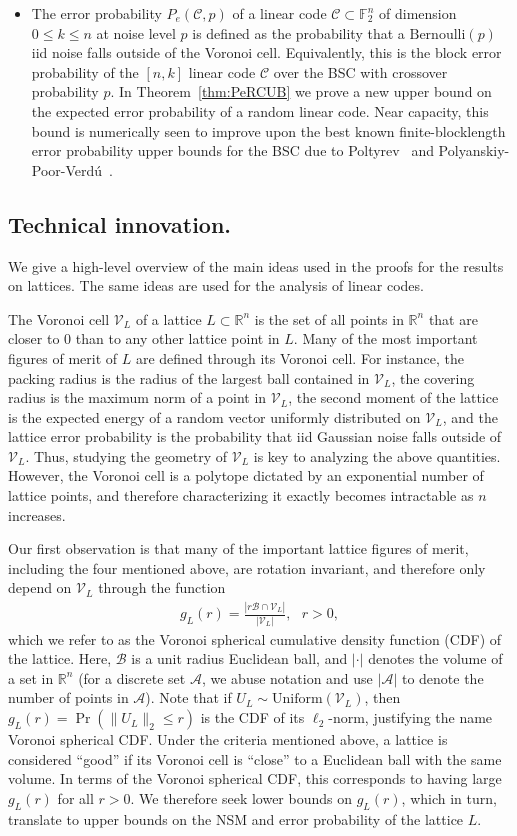 \documentclass[article,doublecolumn]{IEEEtran}
\newcommand{\F}{{\mathbb{F}}}
\newcommand{\R}{{\mathbb{R}}}
\newcommand{\A}{{\mathcal{A}}}
\newcommand{\CC}{{\mathcal{C}}}
\newcommand{\Unif}{\mathrm{Uniform}}
\newcommand{\mVL}{{\mathcal{V}_L}}
\newcommand{\mBeuc}{{\mathcal{B}}}
\newcommand{\VcdfL}{g_L}
\begin{document}
\begin{itemize}
\item The error probability $P_e(\CC,p)$ of a linear code $\mathcal{C}\subset\F_2^n$ of dimension $0\leq k\leq n$ at noise level $p$ is defined as the probability that a $\mathrm{Bernoulli}(p)$ iid noise falls outside of the Voronoi cell. Equivalently, this is the block error probability of the $[n,k]$ linear code $\CC$ over the BSC with crossover probability $p$. In Theorem~\ref{thm:PeRCUB} we prove a new upper bound on the expected error probability of a random linear code. Near capacity, this bound is numerically seen to improve upon the best known finite-blocklength error probability upper bounds for the BSC due to Poltyrev~\cite{poltyrev94} and Polyanskiy-Poor-Verd\'{u}~\cite{ppv10}. 
\end{itemize}

\subsection{Technical innovation.} We give a high-level overview of the main ideas used in the proofs for the results on lattices. The same ideas are used for the analysis of linear codes.

The Voronoi cell $\mVL$ of a lattice $L\subset\R^n$ is the set of all points in $\R^n$ that are closer to $0$ than to any other lattice point in $L$. Many of the most important figures of merit of $L$ are defined through its Voronoi cell. For instance, the packing radius is the radius of the largest ball contained in $\mVL$, the covering radius is the maximum norm of a point in $\mVL$, the second moment of the lattice is the expected energy of a random vector uniformly distributed on $\mVL$, and the lattice error probability is the probability that iid Gaussian noise falls outside of $\mVL$. Thus, studying the geometry of $\mVL$ is key to analyzing the above quantities. However, the Voronoi cell is a polytope dictated by an exponential number of lattice points, and therefore characterizing it exactly becomes intractable as $n$ increases. 

Our first observation is that many of the important lattice figures of merit, including the four mentioned above, are rotation invariant, and therefore only depend on $\mVL$ through the function
\begin{align*}
\VcdfL(r)=\frac{\left|r\mBeuc\cap \mVL\right|}{|\mVL|}, ~~~r>0,
\end{align*}
which we refer to as the Voronoi spherical cumulative density function (CDF) of the lattice. Here, $\mBeuc$ is a unit radius Euclidean ball, and $|\cdot|$ denotes the volume of a set in $\R^n$ (for a discrete set $\A$, we abuse notation and use $|\A|$ to denote the number of points in $\A$). Note that if $U_L\sim\Unif(\mVL)$, then $\VcdfL(r)=\Pr(\|U_L\|_2\leq r)$ is the CDF of its $\ell_2$-norm, justifying the name Voronoi spherical CDF.
Under the criteria mentioned above, a lattice is considered ``good'' if its Voronoi cell is ``close'' to a Euclidean ball with the same volume. In terms of the Voronoi spherical CDF, this corresponds to having large $\VcdfL(r)$ for all $r>0$. We therefore seek lower bounds on $\VcdfL(r)$, which in turn, translate to upper bounds on the NSM and error probability of the lattice $L$. 
\end{document}
